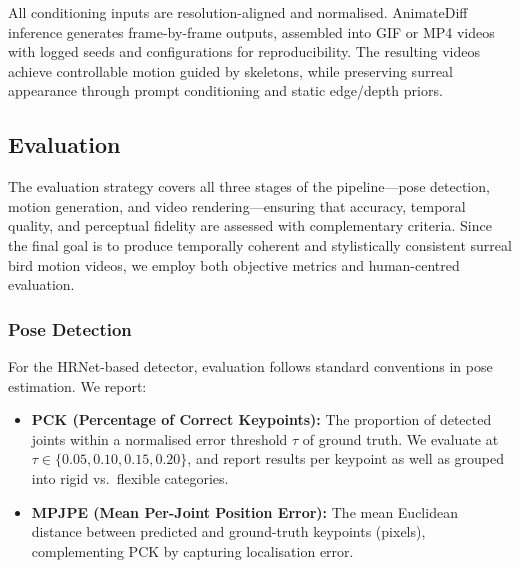 \documentclass[final-report]{report-template}
\begin{document}
All conditioning inputs are resolution-aligned and normalised. AnimateDiff inference generates frame-by-frame outputs, assembled into GIF or MP4 videos with logged seeds and configurations for reproducibility. The resulting videos achieve controllable motion guided by skeletons, while preserving surreal appearance through prompt conditioning and static edge/depth priors.







\subsection{Evaluation}
The evaluation strategy covers all three stages of the pipeline—pose detection, motion generation, and video rendering—ensuring that accuracy, temporal quality, and perceptual fidelity are assessed with complementary criteria. Since the final goal is to produce temporally coherent and stylistically consistent surreal bird motion videos, we employ both objective metrics and human-centred evaluation.

\subsubsection{Pose Detection}
For the HRNet-based detector, evaluation follows standard conventions in pose estimation. We report:

\begin{itemize}
    \item \textbf{PCK (Percentage of Correct Keypoints):} The proportion of detected joints within a normalised error threshold $\tau$ of ground truth. We evaluate at $\tau \in \{0.05,0.10,0.15,0.20\}$, and report results per keypoint as well as grouped into rigid vs.\ flexible categories.
    \item \textbf{MPJPE (Mean Per-Joint Position Error):} The mean Euclidean distance between predicted and ground-truth keypoints (pixels), complementing PCK by capturing localisation error.
\end{itemize}
\end{document}
